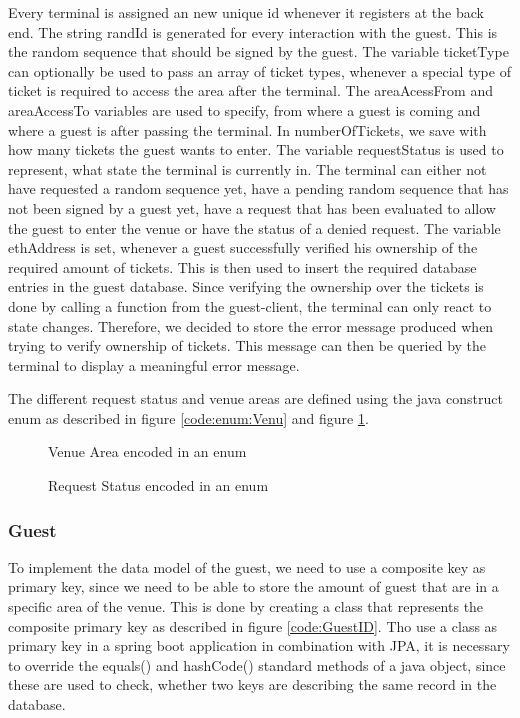 Every terminal is assigned an new unique id whenever it registers at the back end. The string randId is generated for every interaction with the guest. This is the random sequence that should be signed by the guest. The variable ticketType can optionally be used to pass an array of ticket types, whenever a special type of ticket is required to access the area after the terminal. The areaAcessFrom and areaAccessTo variables are used to specify, from where a guest is coming and where a guest is after passing the terminal. In numberOfTickets, we save with how many tickets the guest wants to enter. The variable requestStatus is used to represent, what state the terminal is currently in. The terminal can either not have requested a random sequence yet, have a pending random sequence that has not been signed by a guest yet, have a request that has been evaluated to allow the guest to enter the venue or have the status of a denied request.
The variable ethAddress is set, whenever a guest successfully verified his ownership of the required amount of tickets. This is then used to insert the required database entries in the guest database. Since verifying the ownership over the tickets is done by calling a function from the guest-client, the terminal can only react to state changes. Therefore, we decided to store the error message produced when trying to verify ownership of tickets. This message can then be queried by the terminal to display a meaningful error message. 

The different request status and venue areas are defined using the java construct enum as described in figure \ref{code:enum:Venu} and figure \ref{code:enum:Req}.

\begin{figure}[H]
    
    \caption{Venue Area encoded in an enum}
    \label{code:enum:Venu}
    
    \caption{Request Status encoded in an enum}
    \label{code:enum:Req}
\end{figure}

\subsubsection{Guest}
To implement the data model of the guest, we need to use a composite key as primary key, since we need to be able to store the amount of guest that are in a specific area of the venue. This is done by creating a class that represents the composite primary key as described in figure \ref{code:GuestID}. Tho use a class as primary key in a spring boot application in combination with JPA, it is necessary to override the equals() and hashCode() standard methods of a java object, since these are used to check, whether two keys are describing the same record in the database. 


